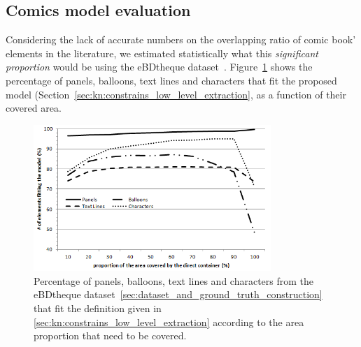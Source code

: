 

\subsection{Comics model evaluation} %
\label{sub:model_evaluation}

Considering the lack of accurate numbers on the overlapping ratio of comic book' elements in the literature, we estimated statistically what this \emph{significant proportion} would be using the eBDtheque dataset~\cite{Guerin2013}.
Figure~\ref{fig:kn:gtfitting} shows the percentage of panels, balloons, text lines and characters that fit the proposed model (Section~\ref{sec:kn:constrains_low_level_extraction}, as a function of their covered area.

 \begin{figure}[!ht]  %
   \centering
  \includegraphics[width=0.8\textwidth]{GTFitting.png}
  \caption[Percentage of panels, balloons, text lines and characters from the eBDtheque dataset that fit the proposed model]{Percentage of panels, balloons, text lines and characters from the eBDtheque dataset~\ref{sec:dataset_and_ground_truth_construction} that fit the definition given in \ref{sec:kn:constrains_low_level_extraction} according to the area proportion that need to be covered.}
  \label{fig:kn:gtfitting}
 \end{figure}

